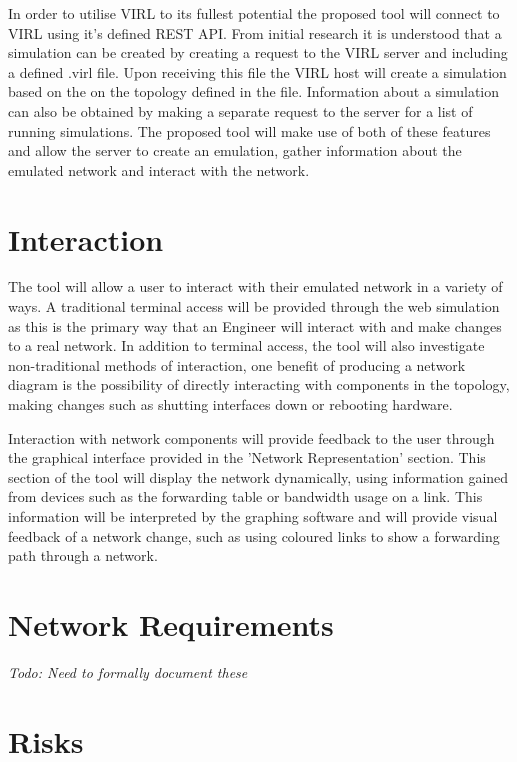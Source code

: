 \documentclass[11pt]{report}
\begin{document}
In order to utilise VIRL to its fullest potential the proposed tool will connect to VIRL using it's defined REST API. From initial research it is understood that a simulation can be created by creating a request to the VIRL server and including a defined .virl file. Upon receiving this file the VIRL host will create a simulation based on the on the topology defined in the file. Information about a simulation can also be obtained by making a separate request to the server for a list of running simulations. The proposed tool will make use of both of these features and allow the server to create an emulation, gather information about the emulated network and interact with the network.

\section{Interaction}

The tool will allow a user to interact with their emulated network in a variety of ways. A traditional terminal access will be provided through the web simulation as this is the primary way that an Engineer will interact with and make changes to a real network. In addition to terminal access, the tool will also investigate non-traditional methods of interaction, one benefit of producing a network diagram is the possibility of directly interacting with components in the topology, making changes such as shutting interfaces down or rebooting hardware.

Interaction with network components will provide feedback to the user through the graphical interface provided in the 'Network Representation' section. This section of the tool will display the network dynamically, using information gained from devices such as the forwarding table or bandwidth usage on a link. This information will be interpreted by the graphing software and will provide visual feedback of a network change, such as using coloured links to show a forwarding path through a network.

\section{Network Requirements}

\textit{Todo: Need to formally document these}

\section{Risks}
\end{document}
